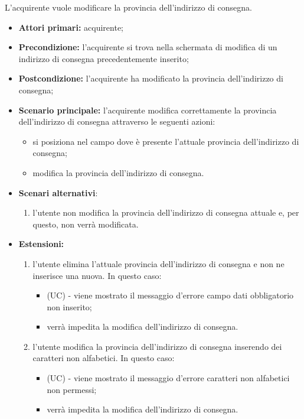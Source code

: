 L'acquirente vuole modificare la provincia dell'indirizzo di consegna.
\begin{itemize}
    \item \textbf{Attori primari:} acquirente;
    \item \textbf{Precondizione:} l'acquirente si trova nella schermata di modifica di un indirizzo di consegna precedentemente inserito;
    \item \textbf{Postcondizione:} l'acquirente ha modificato la provincia dell'indirizzo di consegna;
    \item \textbf{Scenario principale:} l'acquirente modifica correttamente la provincia dell'indirizzo di consegna attraverso le seguenti azioni:
    \begin{itemize}
        \item si posiziona nel campo dove è presente l'attuale provincia dell'indirizzo di consegna;
        \item modifica la provincia dell'indirizzo di consegna.
    \end{itemize}
    \item \textbf{Scenari alternativi}:
    \begin{enumerate}[label=\lett]
        \item l'utente non modifica la provincia dell'indirizzo di consegna attuale e, per questo, non verrà modificata.
    \end{enumerate}
    \item \textbf{Estensioni:}
    \begin{enumerate}[label=\lett]
        \item l'utente elimina l'attuale provincia dell'indirizzo di consegna e non ne inserisce una nuova. In questo caso:
        \begin{itemize}
            \item (UC) - viene mostrato il messaggio d'errore campo dati obbligatorio non inserito;
            \item verrà impedita la modifica dell'indirizzo di consegna.
        \end{itemize}
        \item l'utente modifica la provincia dell'indirizzo di consegna inserendo dei caratteri non alfabetici. In questo caso:
        \begin{itemize}
            \item (UC) - viene mostrato il messaggio d'errore caratteri non alfabetici non permessi;
            \item verrà impedita la modifica dell'indirizzo di consegna.
        \end{itemize}
    \end{enumerate}
\end{itemize}


